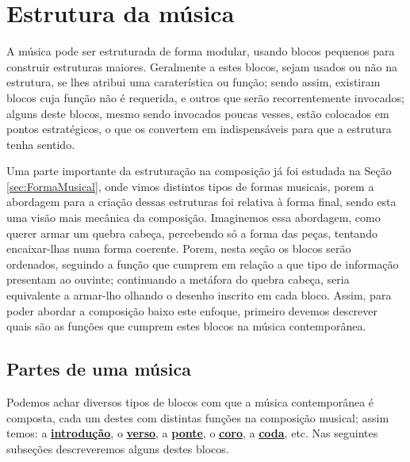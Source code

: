 
\section{Estrutura da música}
\label{sec:estruturadamusica}

A música pode ser estruturada de forma modular, 
usando blocos pequenos para construir estruturas maiores.
Geralmente a estes blocos, sejam usados ou não na estrutura, se lhes atribui uma caraterística ou função;
sendo assim, existiram blocos cuja função não é requerida,
e outros que serão recorrentemente invocados;
alguns deste blocos, mesmo sendo invocados poucas vesses, 
estão colocados em pontos estratégicos, o que os convertem em indispensáveis 
para que a estrutura tenha sentido.

Uma parte importante da estruturação na composição já foi estudada na Seção \ref{sec:FormaMusical},
onde vimos distintos tipos de formas musicais, 
porem a abordagem para a criação dessas estruturas foi relativa à forma final,
sendo esta uma visão mais mecânica da composição.
Imaginemos essa abordagem, como querer armar um quebra cabeça,
percebendo só a forma das peças, tentando encaixar-lhas numa forma coerente.
Porem, nesta seção  os blocos serão ordenados, 
seguindo a função que cumprem em relação a que tipo de informação presentam ao ouvinte;
continuando a metáfora do quebra cabeça, seria equivalente a armar-lho olhando o desenho inscrito em cada bloco.
Assim, para poder abordar a composição baixo este enfoque, 
primeiro devemos descrever quais são as funções que cumprem estes blocos na música contemporânea.


\subsection{Partes de uma música}
\label{subsec:partesmusica}
 Podemos achar diversos tipos de blocos com que a música contemporânea é composta, 
cada um destes com distintas funções na composição musical;
assim temos:
a \hyperref[ref:Introducao]{\textbf{introdução}},
o \hyperref[ref:Verse]{\textbf{verso}},
a \hyperref[ref:Ponte]{\textbf{ponte}},
o \hyperref[ref:Coro]{\textbf{coro}},
a \hyperref[ref:Coda]{\textbf{coda}},
etc.
Nas seguintes subseções descreveremos alguns destes blocos.

